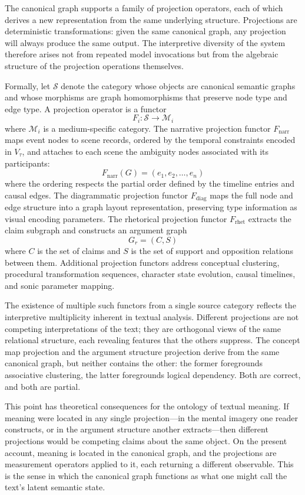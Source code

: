 \documentclass[12pt,a4paper]{article}
\begin{document}
The canonical graph supports a family of projection operators, each of which derives a new representation from the same underlying structure. Projections are deterministic transformations: given the same canonical graph, any projection will always produce the same output. The interpretive diversity of the system therefore arises not from repeated model invocations but from the algebraic structure of the projection operations themselves.

Formally, let $\mathcal{S}$ denote the category whose objects are canonical semantic graphs and whose morphisms are graph homomorphisms that preserve node type and edge type. A projection operator is a functor
\[
F_i : \mathcal{S} \rightarrow \mathcal{M}_i
\]
where $\mathcal{M}_i$ is a medium-specific category. The narrative projection functor $F_\mathrm{narr}$ maps event nodes to scene records, ordered by the temporal constraints encoded in $V_\tau$, and attaches to each scene the ambiguity nodes associated with its participants:
\[
F_\mathrm{narr}(G) = (e_1, e_2, \ldots, e_n)
\]
where the ordering respects the partial order defined by the timeline entries and causal edges. The diagrammatic projection functor $F_\mathrm{diag}$ maps the full node and edge structure into a graph layout representation, preserving type information as visual encoding parameters. The rhetorical projection functor $F_\mathrm{rhet}$ extracts the claim subgraph and constructs an argument graph
\[
G_r = (C, S)
\]
where $C$ is the set of claims and $S$ is the set of support and opposition relations between them. Additional projection functors address conceptual clustering, procedural transformation sequences, character state evolution, causal timelines, and sonic parameter mapping.

The existence of multiple such functors from a single source category reflects the interpretive multiplicity inherent in textual analysis. Different projections are not competing interpretations of the text; they are orthogonal views of the same relational structure, each revealing features that the others suppress. The concept map projection and the argument structure projection derive from the same canonical graph, but neither contains the other: the former foregrounds associative clustering, the latter foregrounds logical dependency. Both are correct, and both are partial.

This point has theoretical consequences for the ontology of textual meaning. If meaning were located in any single projection—in the mental imagery one reader constructs, or in the argument structure another extracts—then different projections would be competing claims about the same object. On the present account, meaning is located in the canonical graph, and the projections are measurement operators applied to it, each returning a different observable. This is the sense in which the canonical graph functions as what one might call the text's latent semantic state.
\end{document}
